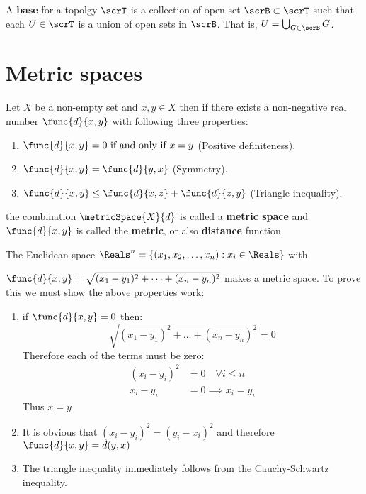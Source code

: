 \begin{definition}
    A \textbf{base} for a topolgy \(\scrT\) is a collection of open set \(\scrB \subset \scrT\) such that each \(U \in \scrT\) is a union of open sets in \(\scrB\). That is, \(U = \bigcup_{G \in \scrB} G\).
\end{definition}

\section{Metric spaces}
Let \(X\) be a non-empty set and \(x,y \in X\) then if there exists a non-negative real number \(\func{d}{x,y}\) with following three properties:
\begin{enumerate}
    \item \(\func{d}{x,y} = 0 \text{ if and only if } x = y\) (Positive definiteness).
    \item \(\func{d}{x,y} = \func{d}{y,x}\) (Symmetry).
    \item \(\func{d}{x,y} \leq \func{d}{x,z} + \func{d}{z,y}\) (Triangle inequality).
\end{enumerate}
the combination \(\metricSpace{X}{d}\) is called a \textbf{metric space} and \(\func{d}{x,y}\) is called the \textbf{metric}, or also \textbf{distance} function.
\begin{example}
    The Euclidean space \(\Reals^n = \{(x_1,x_2,\dots,x_n) : x_i \in \Reals\}\) with \raggedright \(\func{d}{x,y}=\sqrt{(x_1-y_1)^2 + \dots + (x_n - y_n)^2} \) makes a metric space. To prove this we must show the above properties work:
    \begin{enumerate}
        \item if \(\func{d}{x,y} = 0\) then:
              \[ \sqrt{(x_1-y_1)^2 + \dots + (x_n - y_n)^2} = 0 \]
              Therefore each of the terms must be zero:
              \begin{align*}
                  (x_i - y_i)^2 & = 0 \quad  \forall i \leq n \\
                  x_i - y_i     & = 0 \implies x_i = y_i
              \end{align*}
              Thus \(x = y\)
        \item  It is obvious that \((x_i - y_i)^2 = (y_i - x_i)^2\) and therefore \(\func{d}{x,y} = d(y,x)\)
        \item  The triangle inequality immediately follows from the Cauchy-Schwartz inequality.
    \end{enumerate}
\end{example}

